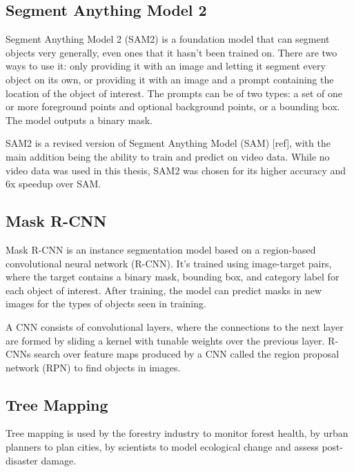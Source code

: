 \documentclass[english, 12pt, a4paper, sci, utf8, a-2b, online]{aaltothesis}
\begin{document}
\subsection{Segment Anything Model 2}

Segment Anything Model 2 (SAM2) is a foundation model that can segment objects very generally, even ones that it hasn't been trained on. There are two ways to use it: only providing it with an image and letting it segment every object on its own, or providing it with an image and a prompt containing the location of the object of interest. The prompts can be of two types: a set of one or more foreground points and optional background points, or a bounding box. The model outputs a binary mask.
\newline
{}
\newline

SAM2 is a revised version of Segment Anything Model (SAM) [ref], with the main addition being the ability to train and predict on video data. While no video data was used in this thesis, SAM2 was chosen for its higher accuracy and 6x speedup over SAM.

\subsection{Mask R-CNN}

Mask R-CNN is an instance segmentation model based on a region-based convolutional neural network (R-CNN). It's trained using image-target pairs, where the target contains a binary mask, bounding box, and category label for each object of interest. After training, the model can predict masks in new images for the types of objects seen in training.

A CNN consists of convolutional layers, where the connections to the next layer are formed by sliding a kernel with tunable weights over the previous layer. R-CNNs search over feature maps produced by a CNN called the region proposal network (RPN) to find objects in images.
\newline
{}
\newline

\subsection{Tree Mapping}

Tree mapping is used by the forestry industry to monitor forest health, by urban planners to plan cities, by scientists to model ecological change and assess post-disaster damage.
\end{document}
